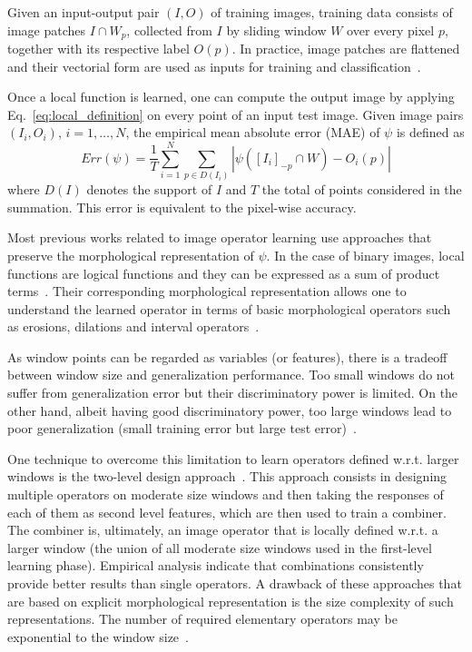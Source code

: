 \documentclass[conference]{IEEEtran}
\begin{document}
Given an input-output pair $(I,O)$ of training images, training data
consists of image patches $I \cap W_{p}$, collected from $I$ by
sliding window $W$ over every pixel $p$, together with its respective
label $O(p)$. In practice, image patches are flattened and their
vectorial form are used as inputs for training and 
classification~\cite{2016:tutorialSIB}.

Once a local function is learned, one can compute the output image by
applying Eq.~\ref{eq:local_definition} on every point of an input test
image. Given image pairs $(I_i,O_i)$, $i=1,\ldots,N$, the empirical
mean absolute error (MAE) of $\psi$ is defined as
\begin{equation}
  \label{eq:MAE}
  Err(\psi) = \frac{1}{T}\sum_{i=1}^{N} \sum_{p \in D(I_i)}
  |\psi([I_i]_{-p}\cap W) - O_i(p)| 
\end{equation}
where $D(I)$ denotes the support of $I$ and $T$ the total of points
considered in the summation. This error is equivalent to the
pixel-wise accuracy.

Most previous works related to image operator learning use 
approaches that preserve the morphological representation of
$\psi$. In the case of binary
images, local functions are logical functions and they can be
expressed as a sum of product
terms~\cite{1997:BarDoughTom,2009:Nina,2016:tutorialSIB}. Their
corresponding morphological
representation allows one to understand the learned operator in terms
of basic morphological operators such as erosions, dilations and
interval operators~\cite{Heij:94}.

As window points can be regarded as variables (or features), there is
a tradeoff between window size and generalization performance. Too
small windows do not suffer from generalization error but their
discriminatory power is limited. On the other hand, albeit having good
discriminatory power, too large windows
lead to poor generalization (small training error but large test
error)~\cite{2016:tutorialSIB}.

One technique to overcome this limitation to learn operators defined
w.r.t. larger windows is the two-level design
approach~\cite{2009:Nina}. This approach
consists in designing multiple operators on moderate size windows and
then taking the responses of each of them as second level features,
which are then used to train a combiner. The combiner is, ultimately,
an image operator that is locally defined w.r.t. a larger window
(the union of all moderate size windows used in the first-level
learning phase). Empirical analysis indicate that combinations
consistently provide better results than single operators.
A drawback of these approaches that are
based on explicit morphological representation is the size complexity
of such representations. The number of required elementary operators
may be exponential to the window size~\cite{2016:tutorialSIB}.
\end{document}
